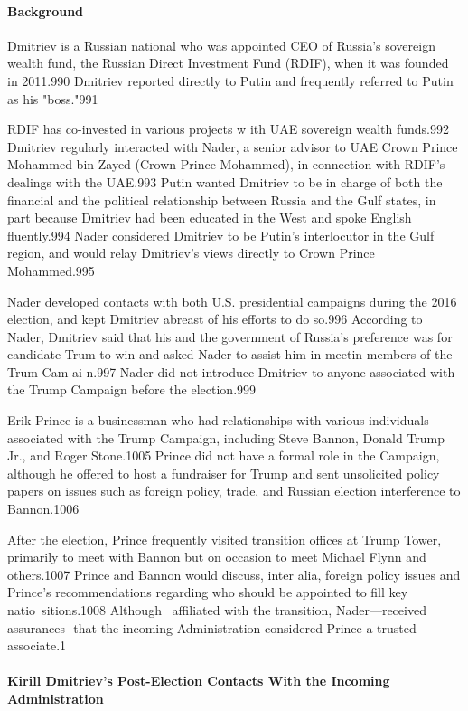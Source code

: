 \paragraph{Background}

Dmitriev is a Russian national who was appointed CEO of Russia's  sovereign wealth fund, the Russian Direct Investment Fund (RDIF), when it was founded in 2011.990 Dmitriev reported directly to Putin and frequently referred to Putin as his "boss."991

RDIF has co-invested in various projects w ith UAE sovereign wealth funds.992 Dmitriev regularly interacted with Nader, a  senior advisor to UAE Crown Prince Mohammed bin Zayed (Crown Prince Mohammed), in connection with RDIF's dealings with the UAE.993 Putin wanted Dmitriev to be in charge of both the financial and the political relationship between Russia and the Gulf states, in part because Dmitriev had been educated in the West and spoke English fluently.994 Nader considered Dmitriev to be Putin's interlocutor in the Gulf region, and would relay Dmitriev's views directly to Crown Prince Mohammed.995

Nader developed contacts with both U.S. presidential campaigns during the 2016 election, and kept Dmitriev abreast of his efforts to do so.996 According to Nader, Dmitriev said that his and the government of Russia's preference was for candidate Trum to win and asked Nader to assist him in meetin members of the Trum Cam ai n.997 Nader did not introduce Dmitriev to anyone associated with the Trump Campaign before the election.999

Erik Prince is a  businessman who had relationships with various individuals associated with the Trump Campaign, including Steve Bannon, Donald Trump Jr., and Roger Stone.1005 Prince did not have a  formal role in the Campaign, although he offered to host a  fundraiser for Trump and sent unsolicited policy papers on issues such as foreign policy, trade, and Russian election interference to Bannon.1006

After the election, Prince frequently visited transition offices at Trump Tower, primarily to meet with Bannon but on occasion to meet Michael Flynn and others.1007 Prince and Bannon would discuss, inter alia, foreign policy issues and Prince's recommendations regarding who should be appointed to fill key natio~sitions.1008 Although~ affiliated with the transition, Nader---received assurances -that the incoming Administration considered Prince a trusted associate.1

\paragraph{Kirill Dmitriev's Post-Election Contacts With the Incoming Administration}

